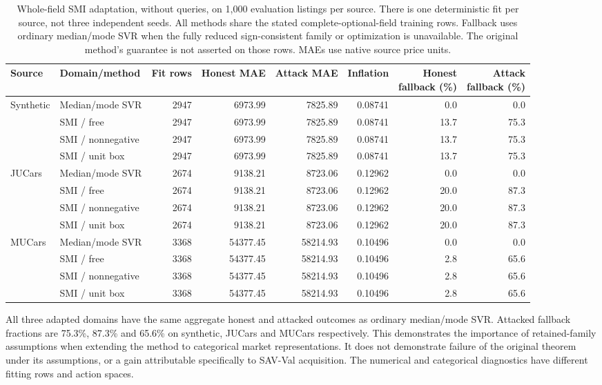 \documentclass[10pt,journal]{IEEEtran}
\begin{document}
\begin{table}[t]
\centering\small\setlength{\tabcolsep}{3pt}
\caption{Whole-field SMI adaptation, without queries, on 1,000 evaluation
listings per source. There is one deterministic fit per source, not three
independent seeds. All methods share the stated complete-optional-field
training rows. Fallback uses ordinary median/mode SVR when the fully reduced
sign-consistent family or optimization is unavailable. The original method's
guarantee is not asserted on those rows. MAEs use native source price units.}
\label{tab:grouped_smi}
\begin{tabular}{llrrrrrr}
\toprule
Source & Domain/method & Fit rows & Honest MAE & Attack MAE & Inflation & \shortstack{Honest\\fallback (\%)} & \shortstack{Attack\\fallback (\%)}\\
\midrule
Synthetic & Median/mode SVR & 2947 & 6973.99 & 7825.89 & 0.08741 & 0.0 & 0.0\\
 & SMI / free & 2947 & 6973.99 & 7825.89 & 0.08741 & 13.7 & 75.3\\
 & SMI / nonnegative & 2947 & 6973.99 & 7825.89 & 0.08741 & 13.7 & 75.3\\
 & SMI / unit box & 2947 & 6973.99 & 7825.89 & 0.08741 & 13.7 & 75.3\\
\midrule
JUCars & Median/mode SVR & 2674 & 9138.21 & 8723.06 & 0.12962 & 0.0 & 0.0\\
 & SMI / free & 2674 & 9138.21 & 8723.06 & 0.12962 & 20.0 & 87.3\\
 & SMI / nonnegative & 2674 & 9138.21 & 8723.06 & 0.12962 & 20.0 & 87.3\\
 & SMI / unit box & 2674 & 9138.21 & 8723.06 & 0.12962 & 20.0 & 87.3\\
\midrule
MUCars & Median/mode SVR & 3368 & 54377.45 & 58214.93 & 0.10496 & 0.0 & 0.0\\
 & SMI / free & 3368 & 54377.45 & 58214.93 & 0.10496 & 2.8 & 65.6\\
 & SMI / nonnegative & 3368 & 54377.45 & 58214.93 & 0.10496 & 2.8 & 65.6\\
 & SMI / unit box & 3368 & 54377.45 & 58214.93 & 0.10496 & 2.8 & 65.6\\
\bottomrule
\end{tabular}
\end{table}

All three adapted domains have the same aggregate honest and attacked
outcomes as ordinary median/mode SVR. Attacked fallback fractions are
75.3\%, 87.3\% and 65.6\% on synthetic, JUCars and MUCars respectively.
This demonstrates the importance of retained-family assumptions when
extending the method to categorical market representations. It does not
demonstrate failure of the original theorem under its assumptions, or a
gain attributable specifically to SAV-Val acquisition. The numerical and
categorical diagnostics have different fitting rows and action spaces.
\end{document}
